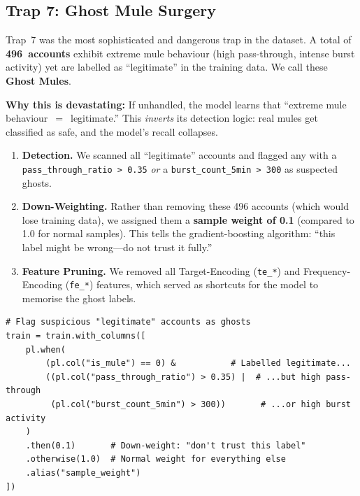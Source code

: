 \documentclass[11pt, a4paper]{article}
\begin{document}
\subsection{Trap 7: Ghost Mule Surgery}

Trap~7 was the most sophisticated and dangerous trap in the dataset. A total of
\textbf{496~accounts} exhibit extreme mule behaviour (high pass-through, intense burst
activity) yet are labelled as ``legitimate'' in the training data. We call these
\textbf{Ghost Mules}.

\textbf{Why this is devastating:}\quad
If unhandled, the model learns that ``extreme mule behaviour~$=$~legitimate.'' This
\emph{inverts} its detection logic: real mules get classified as safe, and the model's
recall collapses.

\begin{solutionbox}
\begin{enumerate}[leftmargin=1.5em, itemsep=4pt]
    \item \textbf{Detection.}\quad
          We scanned all ``legitimate'' accounts and flagged any with a
          \texttt{pass\_through\_ratio\,>\,0.35} \emph{or} a
          \texttt{burst\_count\_5min\,>\,300} as suspected ghosts.

    \item \textbf{Down-Weighting.}\quad
          Rather than removing these 496 accounts (which would lose training data), we
          assigned them a \textbf{sample weight of 0.1} (compared to 1.0 for normal
          samples). This tells the gradient-boosting algorithm: ``this label might be
          wrong---do not trust it fully.''

    \item \textbf{Feature Pruning.}\quad
          We removed all Target-Encoding (\texttt{te\_*}) and Frequency-Encoding
          (\texttt{fe\_*}) features, which served as shortcuts for the model to memorise
          the ghost labels.
\end{enumerate}
\end{solutionbox}

\begin{lstlisting}[caption={Ghost mule detection and down-weighting (actual code from \texttt{step6v11}).}]
# Flag suspicious "legitimate" accounts as ghosts
train = train.with_columns([
    pl.when(
        (pl.col("is_mule") == 0) &           # Labelled legitimate...
        ((pl.col("pass_through_ratio") > 0.35) |  # ...but high pass-through
         (pl.col("burst_count_5min") > 300))       # ...or high burst activity
    )
    .then(0.1)       # Down-weight: "don't trust this label"
    .otherwise(1.0)  # Normal weight for everything else
    .alias("sample_weight")
])
\end{lstlisting}
\end{document}
